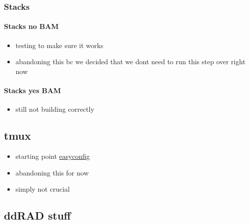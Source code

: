 \documentclass[letterpaper]{scrartcl}
\begin{document}
\subsubsection{Stacks}\label{stacks-1}

\paragraph{Stacks no BAM}\label{stacks-no-bam}

\begin{itemize}
\itemsep1pt\parskip0pt
\item
  testing to make sure it works
\item
  abandoning this bc we decided that we dont need to run this step over
  right now
\end{itemize}

\paragraph{Stacks yes BAM}\label{stacks-yes-bam}

\begin{itemize}
\itemsep1pt\parskip0pt
\item
  still not building correctly
\end{itemize}

\subsection{tmux}\label{tmux}

\begin{itemize}
\itemsep1pt\parskip0pt
\item
  starting point
  \href{https://github.com/fgeorgatos/easybuild.experimental/blob/539bd104d158c9f41b45d60115f6bf1b7155e11e/contrib/pkgsrc/20141219/t/tmux-1.9a-goolf-1.4.10.eb}{easyconfig}
\item
  abandoning this for now
\item
  simply not crucial
\end{itemize}

\subsection{ddRAD stuff}\label{ddrad-stuff}
\end{document}
